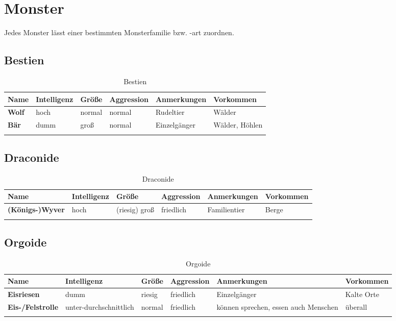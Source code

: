 {\let\clearpage\relax\chapter{Monster}}
Jedes Monster lässt einer bestimmten Monsterfamilie bzw. -art zuordnen. 

\section{Bestien}
\begin{longtable}{|l|l|l|l|l|l|}
\hline
\textbf{Name} & \textbf{Intelligenz} & \textbf{Größe} & \textbf{Aggression} & \textbf{Anmerkungen} & \textbf{Vorkommen} \\ \hline

\textbf{Wolf} & hoch & normal & normal & Rudeltier & Wälder \\ \hline
\textbf{Bär} & dumm & groß & normal & Einzelgänger & Wälder, Höhlen \\ \hline

\caption{Bestien}
\label{tab:Bestien}
\end{longtable}


\section{Draconide}
\begin{longtable}{|l|l|l|l|l|l|}
\hline
\textbf{Name} & \textbf{Intelligenz} & \textbf{Größe} & \textbf{Aggression} & \textbf{Anmerkungen} & \textbf{Vorkommen} \\ \hline

\textbf{(Königs-)Wyver} & hoch & (riesig) groß & friedlich & Familientier & Berge \\ \hline

\caption{Draconide}
\label{tab:Draconide}
\end{longtable}


\section{Orgoide}
\begin{longtable}{|p{3cm}|p{3cm}|p{2cm}|p{2cm}|p{3cm}|p{2.5cm}|}
\hline
\textbf{Name} & \textbf{Intelligenz} & \textbf{Größe} & \textbf{Aggression} & \textbf{Anmerkungen} & \textbf{Vorkommen} \\ \hline

\textbf{Eisriesen} & dumm & riesig & friedlich & Einzelgänger & Kalte Orte \\ \hline
\textbf{Eis-/Felstrolle} & unter-durchschnittlich & normal & friedlich & können sprechen, essen auch Menschen & überall \\ \hline

\caption{Orgoide}
\label{tab:Orgoide}
\end{longtable}



